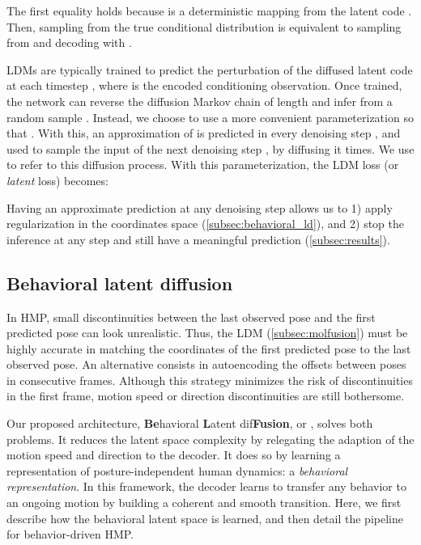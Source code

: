 \documentclass[10pt,twocolumn,letterpaper]{article}
\begin{document}
The first equality holds because  is a deterministic mapping from the latent code . Then, sampling from the true conditional distribution  is equivalent to sampling  from  and decoding  with .

LDMs are typically trained to predict the perturbation  of the diffused latent code  at each timestep , where  is the encoded conditioning observation. Once trained, the network  can reverse the diffusion Markov chain of length  and infer  from a random sample . Instead, we choose to use a more convenient parameterization so that  \cite{xiao2021trilemma, luo2022understandingDM}. With this, an approximation of  is predicted in every denoising step , and used to sample the input of the next denoising step , by diffusing it  times. We use  to refer to this diffusion process. 
With this parameterization, the LDM loss (or \textit{latent} loss) becomes:
\vspace{-0.3cm}


Having an approximate prediction at any denoising step allows us to 1) apply regularization in the coordinates space (\autoref{subsec:behavioral_ld}), and 2) stop the inference at any step and still have a meaningful prediction (\autoref{subsec:results}). 






\subsection{Behavioral latent diffusion}
\label{subsec:behavioral_ld}

In HMP, small discontinuities between the last observed pose and the first predicted pose can look unrealistic. Thus, the LDM (\autoref{subsec:molfusion}) must be highly accurate in matching the coordinates of the first predicted pose to the last observed pose. 
An alternative consists in autoencoding the offsets between poses in consecutive frames. Although this strategy minimizes the risk of discontinuities in the first frame, motion speed or direction discontinuities are still bothersome.

Our proposed architecture, \textbf{Be}havioral \textbf{L}atent dif\textbf{Fusion}, or \modelname{}, solves both problems. It reduces the latent space complexity by relegating the adaption of the motion speed and direction to the decoder. It does so by learning a representation of posture-independent human dynamics: a \textit{behavioral representation}. In this framework, the decoder learns to transfer any behavior to an ongoing motion by building a coherent and smooth transition. Here, we first describe how the behavioral latent space is learned, and then detail the \modelname{} pipeline for behavior-driven HMP. 
\end{document}
